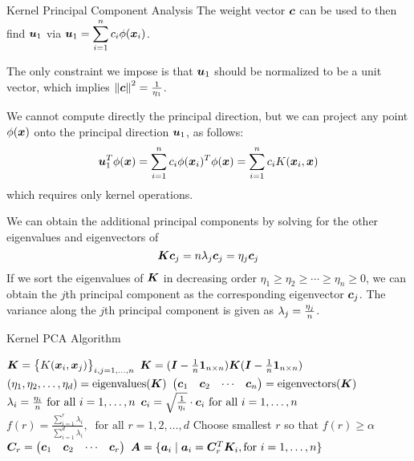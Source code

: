 \begin{frame}{Kernel Principal Component Analysis}
  \small
  The weight vector ${\boldsymbol c}$ can be used to then find ${\boldsymbol u}_1$ via
${\boldsymbol u}_1 = \displaystyle \sum_{i=1}^n c_{i} \phi({\boldsymbol x}_i)$.

\medskip
The only constraint we impose is that ${\boldsymbol u}_1$
should be
normalized to be a unit vector, which implies
  $\left\lVert{\boldsymbol c}\right\rVert^2 = {1 \over \eta_1}$.


\medskip
We cannot compute directly the
principal direction, but we can
project any point $\phi({\boldsymbol x})$ onto the principal
direction ${\boldsymbol u}_1$, as follows:
\begin{align*}
  {\boldsymbol u}_1^T\phi({\boldsymbol x}) = \displaystyle \sum_{i=1}^n c_i\phi({\boldsymbol x}_i)^T\phi({\boldsymbol x}) =
  \displaystyle \sum_{i=1}^n c_i K({\boldsymbol x}_i,{\boldsymbol x})
\end{align*}
which requires only kernel operations. 

\medskip
We can obtain the additional principal
components by solving for the other eigenvalues and eigenvectors of
$${\boldsymbol K}{\boldsymbol c}_j = n \lambda_j {\boldsymbol c}_j = \eta_j {\boldsymbol c}_j$$
If we sort the
eigenvalues of ${\boldsymbol K}$ in decreasing order
$\eta_1 \ge \eta_2 \ge \cdots
\ge \eta_n \ge 0$, we can obtain the $j$th principal component as
the corresponding eigenvector ${\boldsymbol c}_{j}$.
The variance
along the $j$th principal component is given as 
$\lambda_{j} = {\eta_{j} \over n}$. 
\end{frame}


\begin{frame}{Kernel PCA Algorithm}
\begin{tightalgo}[H]{\textwidth-18pt}
\newcommand{\KPCA}{\textsc{KernelPCA}}
\SetKwInOut{Algorithm}{\KPCA\ ($\bD, K, \alpha$)}
\Algorithm{}
${\boldsymbol K} = \bigl\{K({\boldsymbol x}_i, {\boldsymbol x}_{j}) \bigr\}_{i,j=1,\ldots,n}$ 
${\boldsymbol K}  = ({\boldsymbol I} - {1\over n}\mathbf{1}_{n\times n}) {\boldsymbol K} ({\boldsymbol I} - {1\over
n}\mathbf{1}_{n \times n})$ 
$(\eta_1, \eta_2, \ldots, \eta_d) =
\text{eigenvalues}({\boldsymbol K})$ 
$\begin{pmatrix} {\boldsymbol c}_1 & {\boldsymbol c}_2 & \cdots & {\boldsymbol c}_n \end{pmatrix} =
\text{eigenvectors}({\boldsymbol K})$ 
$\lambda_i = {\eta_i \over n} \text{ for all } i = 1, \ldots,
n$ 
${\boldsymbol c}_i = \sqrt{1 \over \eta_i} \cdot {\boldsymbol c}_i \text{ for all } i =
1, \ldots, n$ 
$f(r) = \frac{\sum_{i=1}^r \lambda_i}{\sum_{i=1}^d \lambda_i},
\;\; \text{for all } r=1, 2, \ldots, d$ 
Choose smallest $r$ so that $f(r) \ge \alpha$ 
${\boldsymbol C}_r = \begin{pmatrix} {\boldsymbol c}_1 & {\boldsymbol c}_2 & \cdots & {\boldsymbol c}_r \end{pmatrix}$ 
${\boldsymbol A} = \{{\boldsymbol a}_i \mid {\boldsymbol a}_i = {\boldsymbol C}_r^T{\boldsymbol K}_i, \text{for } i=1, \ldots,
n\}$ 
\end{tightalgo}
\end{frame}


